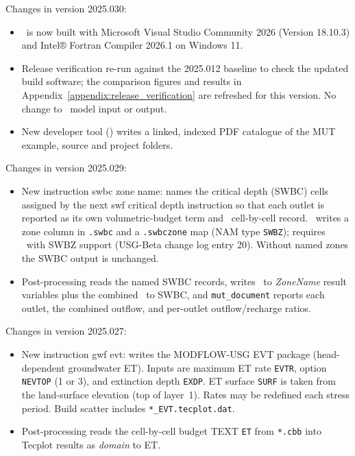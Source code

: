 \label{changes:2025.030}
Changes in version 2025.030:
\begin{itemize}
\item \mut\ is now built with Microsoft Visual Studio Community 2026 (Version 18.10.3) and Intel® Fortran Compiler 2026.1 on Windows 11.
\item Release verification re-run against the 2025.012 baseline to check the updated build software; the comparison figures and results in Appendix~\ref{appendix:release_verification} are refreshed for this version. No change to \mut\ model input or output.
\item New developer tool  () writes a linked, indexed PDF catalogue of the MUT example, source and project folders.
\end{itemize}

\label{changes:2025.029}
Changes in version 2025.029:
\begin{itemize}
\item New instruction {\sf swbc zone name}: names the critical depth (\textsf{SWBC}) cells assigned by the next {\sf swf critical depth} instruction so that each outlet is reported as its own volumetric-budget term and \swf\ cell-by-cell record. \mut\ writes a zone column in \texttt{.swbc} and a \texttt{.swbczone} map (NAM type \texttt{SWBZ}); requires \mfus\ with SWBZ support (USG-Beta change log entry 20). Without named zones the \textsf{SWBC} output is unchanged.
\item Post-processing reads the named SWBC records, writes \swf\ to {\em ZoneName} result variables plus the combined \swf\ to SWBC, and \texttt{mut\_document} reports each outlet, the combined outflow, and per-outlet outflow/recharge ratios.
\end{itemize}

\label{changes:2025.027}
Changes in version 2025.027:
\begin{itemize}
\item New instruction {\sf gwf evt}: writes the MODFLOW-USG \textsf{EVT} package (head-dependent groundwater ET). Inputs are maximum ET rate \texttt{EVTR}, option \texttt{NEVTOP} (1 or 3), and extinction depth \texttt{EXDP}. ET surface \texttt{SURF} is taken from the land-surface elevation (top of layer~1). Rates may be redefined each stress period. Build scatter includes \texttt{*\_EVT.tecplot.dat}.
\item Post-processing reads the cell-by-cell budget TEXT \texttt{ET} from \texttt{*.cbb} into Tecplot results as {\em domain} to ET.
\end{itemize}

